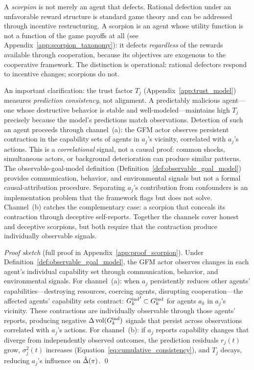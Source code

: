 A \emph{scorpion} is not merely an agent that defects. Rational defection under
an unfavorable reward structure is standard game theory and can be addressed
through incentive restructuring. A scorpion is an agent whose utility function
is not a function of the game payoffs at all (see
Appendix~\ref{app:scorpion_taxonomy}): it defects \emph{regardless} of the
rewards available through cooperation, because its objectives are exogenous to
the cooperative framework. The distinction is operational: rational defectors
respond to incentive changes; scorpions do not.

An important clarification: the trust factor $T_j$
(Appendix~\ref{app:trust_model}) measures \emph{prediction consistency}, not
alignment. A predictably malicious agent---one whose destructive behavior is
stable and well-modeled---maintains high $T_j$ precisely because the model's
predictions match observations. Detection of such an agent proceeds through
channel~(a): the GFM actor observes persistent contraction in the capability
sets of agents in $a_j$'s vicinity, correlated with $a_j$'s actions. This is a
\emph{correlational} signal, not a causal proof: common shocks, simultaneous
actors, or background deterioration can produce similar patterns. The
observable-goal-model definition (Definition~\ref{def:observable_goal_model})
provides communication, behavior, and environmental signals but not a formal
causal-attribution procedure. Separating $a_j$'s contribution from confounders
is an implementation problem that the framework flags but does not solve.
Channel~(b) catches the complementary case: a scorpion that conceals its
contraction through deceptive self-reports. Together the channels cover honest
and deceptive scorpions, but both require that the contraction produce
individually observable signals.

\emph{Proof sketch} (full proof in Appendix~\ref{app:proof_scorpion}).
Under Definition~\ref{def:observable_goal_model}, the GFM
actor observes changes in each agent's individual capability set through
communication, behavior, and environmental signals. For channel~(a): when $a_j$
persistently reduces other agents' capabilities---destroying resources,
coercing agents, disrupting cooperation---the affected agents' capability sets
contract: ${G_{k}^{\mathrm{ind}}}' \subset G_{k}^{\mathrm{ind}}$ for agents $a_k$ in $a_j$'s vicinity.
These contractions are individually observable through those agents' reports,
producing negative $\Delta \operatorname{vol}(G_{k}^{\mathrm{ind}})$ signals that persist across
observations correlated with $a_j$'s actions. For channel~(b): if $a_j$ reports
capability changes that diverge from independently observed outcomes, the
prediction residuals $r_j(t)$ grow, $\sigma_j^2(t)$ increases
(Equation~\ref{eq:cumulative_consistency}), and $T_j$ decays, reducing $a_j$'s
influence on $\hat{\Delta}(\pi)$. \qed

